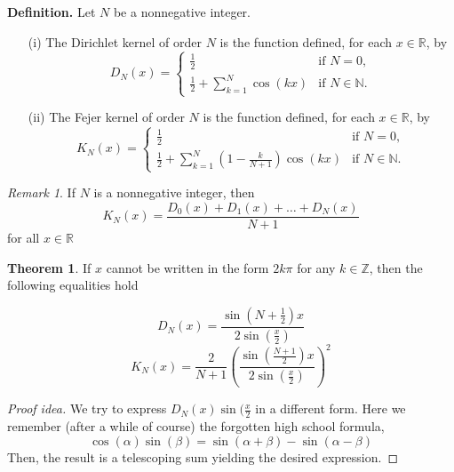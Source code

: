 \documentclass{article}
\theoremstyle{remark}
\newtheorem*{remark}{Remark}
\theoremstyle{exercise}
\theoremstyle{definition}
\newtheorem{theorem}{Theorem}
\begin{document}
\textbf{Definition.} Let $N$ be a nonnegative integer.
\begin{enumerate}
  \item[(i)] The Dirichlet kernel of order $N$ is the function defined, for each $x \in \mathbb{R}$, by
  \[
  D_N(x) = \begin{cases}
            \frac{1}{2} & \text{if } N = 0, \\
            \frac{1}{2}  + \sum_{k=1}^{N} \cos(kx) & \text{if } N \in \mathbb{N}.
           \end{cases}
  \]

  \item[(ii)] The Fejer kernel of order $N$ is the function defined, for each $x \in \mathbb{R}$, by
  \[
  K_N(x) = \begin{cases}
            \frac{1}{2} & \text{if } N = 0, \\
            \frac{1}{2} + \sum_{k=1}^{N}\left( 1 - \frac{k}{N + 1} \right)\cos(kx) & \text{if } N \in \mathbb{N}.
           \end{cases}
  \]
\end{enumerate}

\begin{remark}
    If $N$ is a nonnegative integer, then
\[
K_N(x) = \frac{D_0(x) + D_1(x) + \dots + D_N(x)}{N+1}
\]
for all $x \in \mathbb{R}$
\end{remark}

\begin{theorem}
    If $x$ cannot be written in the form $2k\pi$ for any $k \in \mathbb{Z}$, then the following equalities hold

    \[
    D_N(x) = \frac{\sin(N + \frac{1}{2})x}{2\sin(\frac{x}{2})}
    \]
    \[
    K_N(x) = \frac{2}{N+1}(\frac{\sin(\frac{N + 1}{2})x}{2\sin(\frac{x}{2})})^2
    \]
\end{theorem}
\begin{proof}[Proof idea] We try to express  $D_N(x)\sin(\frac{x}{2}$ in a different form. Here we remember (after a while of course) the forgotten high school formula,
\[
\cos(\alpha)\sin(\beta) = \sin(\alpha + \beta) - \sin(\alpha - \beta)
\]
    Then, the result is a telescoping sum yielding the desired expression.
\end{proof}
\end{document}
